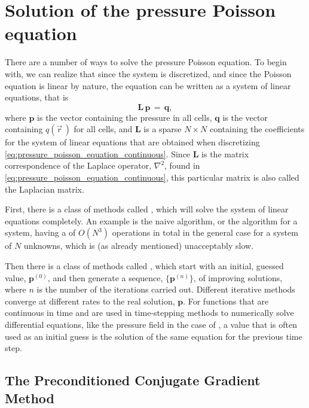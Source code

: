 \section{Solution of the pressure Poisson equation}

\label{sec:pressure_poisson_equation_solution}

There are a number of ways to solve the pressure Poisson equation. To begin with, we can realize that since the system is discretized, and since the Poisson equation is linear by nature, the equation can be written as a system of linear equations, that is
%
\begin{equation} \label{eq:pressure_poisson_equation_matrix}
\mathbf{L\,p} \,=\, \mathbf{q},
\end{equation}
%
where $\mathbf{p}$ is the vector containing the pressure in all cells, $\mathbf{q}$ is the vector containing $q(\vec{r}\,)$ for all cells, and $\mathbf{L}$ is a sparse $N\times N$  containing the coefficients for the system of linear equations that are obtained when discretizing \eqref{eq:pressure_poisson_equation_continuous}. Since $\mathbf{L}$ is the matrix correspondence of the Laplace operator, $\nabla^2$, found in \eqref{eq:pressure_poisson_equation_continuous}, this particular matrix is also called the Laplacian matrix.

First, there is a class of methods called , which will solve the system of linear equations completely. An example is the naive  algorithm, or the  algorithm for a  system, having a  of $O(N^3)$ operations in total in the general case for a system of $N$ unknowns, which is (as already mentioned) unacceptably slow.

Then there is a class of methods called , which start with an initial, guessed value, $\mathbf{p}^{(0)}$, and then generate a sequence, $\{\mathbf{p}^{(n)}\}$, of improving \approximate solutions, where $n$ is the number of the iterations carried out. Different iterative methods converge at different rates to the real solution, $\mathbf{p}$. For functions that are continuous in time and are used in time-stepping methods to numerically solve differential equations, like the pressure field in the case of \CFD, a value that is often used as an initial guess is the solution of the same equation for the previous time step.

\subsection{The Preconditioned Conjugate Gradient Method}

